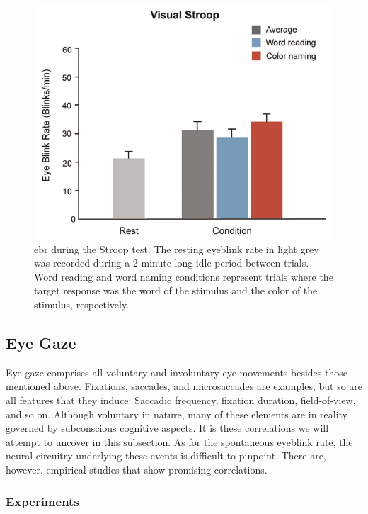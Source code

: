 \begin{figure}[h!]
    \centering
    \includegraphics[width=\textwidth]{figures/bt_oh2012B.png}
    \caption{\acrfull{ebr} during the Stroop test. The resting eyeblink rate in light grey was recorded during a 2 minute long idle period between trials. Word reading and word naming conditions represent trials where the target response was the word of the stimulus and the color of the stimulus, respectively.}
    \label{fig:bt/oh2012B}
\end{figure}

\subsection{Eye Gaze} \label{sec:bt/cognitive_impacts/gaze}

Eye gaze comprises all voluntary and involuntary eye movements besides those mentioned above. Fixations, saccades, and microsaccades are examples, but so are all features that they induce: Saccadic frequency, fixation duration, field-of-view, and so on. Although voluntary in nature, many of these elements are in reality governed by subconscious cognitive aspects. It is these correlations we will attempt to uncover in this subsection. As for the spontaneous eyeblink rate, the neural circuitry underlying these events is difficult to pinpoint. There are, however, empirical studies that show promising correlations.

\newpage
\subsubsection{Experiments}

